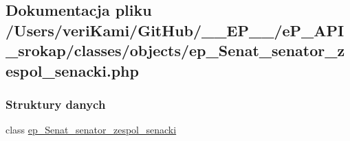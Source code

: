 \hypertarget{ep___senat__senator__zespol__senacki_8php}{\subsection{Dokumentacja pliku /\-Users/veri\-Kami/\-Git\-Hub/\-\_\-\-\_\-\-E\-P\-\_\-\-\_\-/e\-P\-\_\-\-A\-P\-I\-\_\-srokap/classes/objects/ep\-\_\-\-Senat\-\_\-senator\-\_\-zespol\-\_\-senacki.php}
\label{ep___senat__senator__zespol__senacki_8php}
}
\subsubsection*{Struktury danych}
\begin{DoxyCompactItemize}
\item 
class \hyperlink{classep___senat__senator__zespol__senacki}{ep\-\_\-\-Senat\-\_\-senator\-\_\-zespol\-\_\-senacki}
\end{DoxyCompactItemize}
